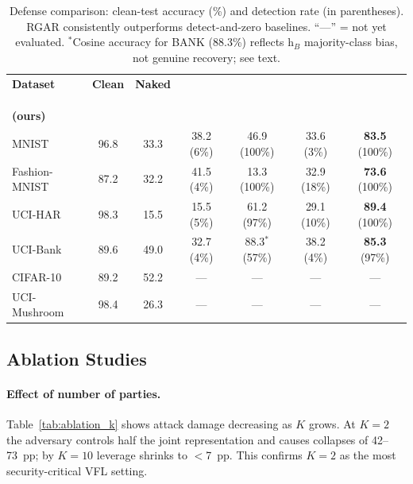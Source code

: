 \documentclass{article}
\begin{document}
\begin{table}[t]
\centering
\caption{Defense comparison: clean-test accuracy (\%) and detection rate
  (in parentheses). RGAR consistently outperforms detect-and-zero baselines.
  ``---'' = not yet evaluated. $^*$Cosine accuracy for BANK (88.3\%) reflects
  h$_B$ majority-class bias, not genuine recovery; see text.}
\label{tab:defense}
\small
\setlength{\tabcolsep}{3pt}
\begin{tabular}{l c c c c c c}
\toprule
\textbf{Dataset} & \textbf{Clean} & \textbf{Naked}
  & \makecell{\textbf{Krum}\\\citep{blanchard2017machine}}
  & \makecell{\textbf{Cosine}\\\citep{cao2022fltrust}}
  & \makecell{\textbf{AE Gate}\\\citep{cho2024vflip}}
  & \makecell{\textbf{RGAR}\\\textbf{(ours)}} \\
\midrule
MNIST         & 96.8 & 33.3
  & 38.2 (6\%)  & 46.9 (100\%)  & 33.6 (3\%)   & \textbf{83.5} (100\%) \\
Fashion-MNIST & 87.2 & 32.2
  & 41.5 (4\%)  & 13.3 (100\%)  & 32.9 (18\%)  & \textbf{73.6} (100\%) \\
UCI-HAR       & 98.3 & 15.5
  & 15.5 (5\%)  & 61.2 (97\%)   & 29.1 (10\%)  & \textbf{89.4} (100\%) \\
UCI-Bank      & 89.6 & 49.0
  & 32.7 (4\%)  & 88.3$^*$(57\%)& 38.2 (4\%)   & \textbf{85.3} (97\%) \\
CIFAR-10      & 89.2 & 52.2
  & ---          & ---            & ---           & --- \\
UCI-Mushroom  & 98.4 & 26.3
  & ---          & ---            & ---           & --- \\
\bottomrule
\end{tabular}
\end{table}

\subsection{Ablation Studies}

\paragraph{Effect of number of parties.}
Table~\ref{tab:ablation_k} shows attack damage decreasing as $K$ grows.
At $K\!=\!2$ the adversary controls half the joint representation and causes
collapses of 42--73~pp; by $K\!=\!10$ leverage shrinks to $<$7~pp.
This confirms $K\!=\!2$ as the most security-critical VFL setting.
\end{document}
